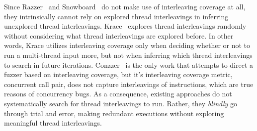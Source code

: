 Since Razzer~\cite{razzer} and Snowboard~\cite{snowboard} do not make
use of interleaving coverage at all, they intrinsically cannot rely on
explored thread interleavings in inferring unexplored thread
interleavings.
%
Krace~\cite{krace} explores thread interleavings randomly without
considering what thread interleavings are explored before. In other
words, Krace utilizes interleaving coverage only when deciding whether
or not to run a multi-thread input more, but not when inferring which
thread interleavings to search in future iterations.
%
Conzzer~\cite{conzzer} is the only work that attempts to direct a
fuzzer based on interleaving coverage, but it's interleaving coverage
metric, concurrent call pair, does not capture interleavings of
instructions, which are true reasons of concurrency bugs.
%
As a consequence, existing approaches do not systematically search for
thread interleavings to run. Rather, they \textit{blindly} go through
trial and error, making redundant executions without exploring
meaningful thread interleavings.












